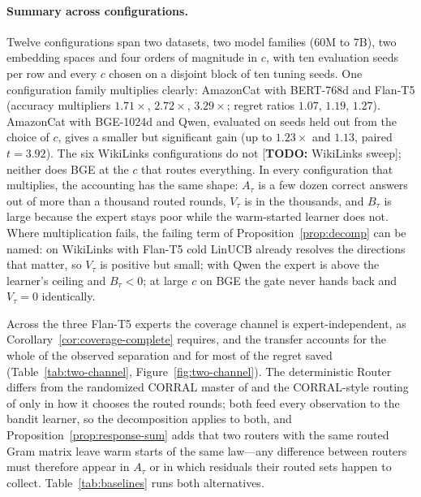 \documentclass{article}
\theoremstyle{definition}
\theoremstyle{remark}
\theoremstyle{remark}
\newcommand{\todo}[1]{\textcolor{red!70!black}{[\textbf{TODO:} #1]}}
\begin{document}
\paragraph{Summary across configurations.}
Twelve configurations span two datasets, two model families (60M to 7B), two
embedding spaces and four orders of magnitude in $c$, with ten evaluation
seeds per row and every $c$ chosen on a disjoint block of ten tuning seeds. One configuration family
multiplies clearly: AmazonCat with BERT-768d and Flan-T5 (accuracy multipliers
$1.71\times$, $2.72\times$, $3.29\times$; regret ratios $1.07$, $1.19$,
$1.27$). AmazonCat with BGE-1024d and Qwen, evaluated on seeds held out from
the choice of $c$, gives a smaller but significant gain (up to $1.23\times$ and
$1.13$, paired $t=3.92$). The six WikiLinks configurations do not \todo{WikiLinks sweep};
neither does BGE at the $c$ that routes everything. In every configuration
that multiplies, the accounting has the same shape: $A_\tau$ is a few dozen
correct answers out of more than a thousand routed rounds, $V_\tau$ is in the
thousands, and $B_\tau$ is large because the expert stays poor while the
warm-started learner does not. Where multiplication fails, the failing term of
Proposition~\ref{prop:decomp} can be named: on WikiLinks with Flan-T5 cold
LinUCB already resolves the directions that matter, so $V_\tau$ is positive
but small; with Qwen the expert is above the learner's ceiling and $B_\tau<0$;
at large $c$ on BGE the gate never hands back and $V_\tau=0$ identically.

Across the three Flan-T5 experts the coverage channel is
expert-independent, as Corollary~\ref{cor:coverage-complete} requires, and the
transfer accounts for the whole of the observed separation and for most of the
regret saved (Table~\ref{tab:two-channel}, Figure~\ref{fig:two-channel}). The deterministic Router differs from the
randomized CORRAL master of \cite{agarwal2017corralling} and the CORRAL-style
routing of \cite{chen2024llmdecision} only in how it chooses the routed
rounds; both feed every observation to the bandit learner, so the
decomposition applies to both, and Proposition~\ref{prop:response-sum} adds
that two routers with the same routed Gram matrix leave warm starts of the
same law---any difference between routers must therefore appear in $A_\tau$ or
in which residuals their routed sets happen to collect.
Table~\ref{tab:baselines} runs both alternatives.
\end{document}

